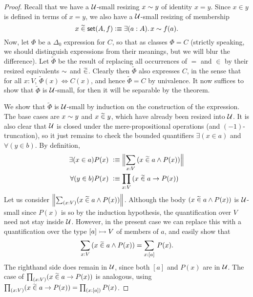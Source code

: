 \begin{proof}
Recall that we have a $\mathcal{U}$-small resizing $x \sim y$ of identity $x = y$. Since $x\in y$ is defined in terms of $x=y$, we also have a $\mathcal{U}$-small resizing of membership
%
\begin{equation*}
  x\bin\vset(A,f) \defeq \exis{a:A} x \bisim f(a).
\end{equation*}
%
Now, let $\Phi$ be a $\Delta_0$ expression for $C$, so that as classes $\Phi = C$ (strictly speaking, we should distinguish expressions from their meanings, but we will blur the difference). Let $\widetilde{\Phi}$ be the result of replacing all occurrences of $=$ and $\in$ by their resized equivalents $\sim$ and $\mathrel{\widetilde{\in}}$.  Clearly then $\widetilde{\Phi}$ also expresses $C$, in the sense that for all $x:V$, $\widetilde{\Phi}(x) \Leftrightarrow C(x)$, and hence $\widetilde{\Phi}=C$ by univalence.  It now suffices to show that $\widetilde{\Phi}$ is $\mathcal{U}$-small, for then it will be separable by the theorem.  

We show that  $\widetilde{\Phi}$ is $\mathcal{U}$-small by induction on the construction of the expression.  The base cases are $x \sim y$ and $x\mathrel{\widetilde{\in}} y$, which have already been resized into $\mathcal{U}$.  It is also clear that $\mathcal{U}$ is closed under the mere-propositional operations (and $(-1)$-truncation), so it just remains to check the bounded quantifiers $\exists(x\in a)$ and $\forall(y\in b)$.  By definition,  
\begin{align*}
\exists(x\in a) P(x)\ &\defeq \Brck {\sm{x:V}(x\bin a \land P(x))}\\
\forall(y\in b) P(x)\ &\defeq  \prd{x:V}(x\bin a \to P(x))
\end{align*} 
Let us consider $\brck {\sm{x:V}(x\bin a \land P(x))}$.  Although the body $(x\mathrel{\widetilde{\in}} a \land P(x))$ is $\mathcal{U}$-small since $P(x)$ is so by the induction hypothesis, the quantification over $V$ need not stay inside $\mathcal{U}$.  However, in the present case we can replace this with a quantification over the type $[a]\rightarrowtail V$ of members of $a$, and easily show that
\begin{equation*}
  \sm{x:V}(x\bin a \land P(x)) = \sm{x:[a]} P(x).
\end{equation*}
The righthand side does remain in $\mathcal{U}$, since both $[a]$ and $P(x)$ are in $\mathcal{U}$.  The case of $\prd{x:V}(x\bin a \to P(x))$ is analogous, using $\prd{x:V}(x\bin a \to P(x)) = \prd{x:[a]}P(x)$.
\end{proof}

